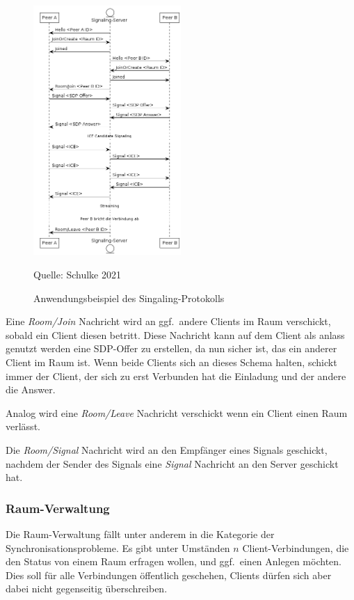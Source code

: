 \documentclass{article}
\newcommand{\figuresource}[1]{
	\begin{center}Quelle: #1\end{center}
}
\begin{document}
\begin{onecolumn}
\begin{figure}[ht]
	\includegraphics[width=0.5\textwidth]{signaling-protocol}
	\centering
	\caption{Anwendungsbeispiel des Singaling-Protokolls}
	\figuresource{Schulke 2021}
\end{figure}

Eine \textit{Room/Join} Nachricht wird an ggf.\ andere Clients im Raum
verschickt, sobald ein Client diesen betritt. Diese Nachricht kann auf dem
Client als anlass genutzt werden eine SDP-Offer zu erstellen, da nun sicher
ist, das ein anderer Client im Raum ist. Wenn beide Clients sich an dieses
Schema halten, schickt immer der Client, der sich zu erst Verbunden hat die
Einladung und der andere die Answer.

Analog wird eine \textit{Room/Leave} Nachricht verschickt wenn ein Client einen
Raum verlässt.

Die \textit{Room/Signal} Nachricht wird an den Empfänger eines Signals
geschickt, nachdem der Sender des Signals eine \textit{Signal} Nachricht an den
Server geschickt hat.

\subsubsection{Raum-Verwaltung}

Die Raum-Verwaltung fällt unter anderem in die Kategorie der
Synchronisationsprobleme. Es gibt unter Umständen $n$ Client-Verbindungen, die
den Status von einem Raum erfragen wollen, und ggf.\ einen Anlegen möchten. Dies
soll für alle Verbindungen öffentlich geschehen, Clients dürfen sich aber dabei
nicht gegenseitig überschreiben.


\end{onecolumn}
\end{document}
